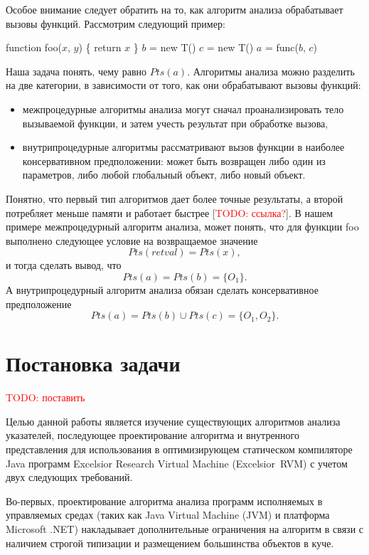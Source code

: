 \documentclass[a4,14pt,titlepage]{extarticle}
\newcommand{\todo}[1]{\textcolor{red}{TODO: #1}}
\newcommand{\eng}[1]{{\English#1}}
\begin{document}
    Особое внимание следует обратить на то, как алгоритм анализа обрабатывает
    вызовы функций. Рассмотрим следующий пример:
    \begin{algorithmic}[1]
    \STATE function foo($x$, $y$) \{ return $x$ \}
    \STATE $b$ = new T()
    \STATE $c$ = new T()
    \STATE $a$ = func($b$, $c$)
    \end{algorithmic}
    Наша задача понять, чему равно $Pts(a)$.
    Алгоритмы анализа можно разделить на две категории, в зависимости от того,
    как они обрабатывают вызовы функций:
    \begin{itemize}
      \item межпроцедурные алгоритмы анализа могут сначал проанализировать
            тело вызываемой функции, и затем учесть результат при обработке
            вызова,
      \item внутрипроцедурные алгоритмы рассматривают вызов функции в наиболее
            консервативном предположении: может быть возвращен либо один из
            параметров, либо любой глобальный объект, либо новый объект.
    \end{itemize}
    Понятно, что первый тип алгоритмов дает более точные результаты,
    а второй потребляет меньше памяти и работает быстрее [\todo{ссылка?}].
    В нашем примере межпроцедурный алгоритм анализа, может понять, что
    для функции foo выполнено следующее условие на возвращаемое значение
    \[Pts(retval) = Pts(x),\]
    и тогда сделать вывод, что \[Pts(a) = Pts(b) = \{O_1\}.\]
    А внутрипроцедурный алгоритм анализа обязан сделать консервативное
    предположение \[Pts(a) = Pts(b) \cup Pts(c) = \{O_1, O_2\}.\]


  \newpage
  \section{Постановка задачи}
    \todo{поставить}

    Целью данной работы является изучение существующих алгоритмов анализа
    указателей, последующее проектирование алгоритма и
    внутренного представления для использования в оптимизирующем
    статическом компиляторе Java программ
    \eng{Excelsior Research Virtual Machine (Excelsior~RVM)}
    с учетом двух следующих требований.

    Во-первых,
    проектирование алгоритма анализа программ исполняемых в управляемых средах
    (таких как \eng{Java Virtual Machine (JVM)} и платформа
    \eng{Microsoft .NET}) накладывает дополнительные ограничения на алгоритм в
    связи с наличием строгой типизации и размещением большинства объектов в
    куче.
\end{document}
